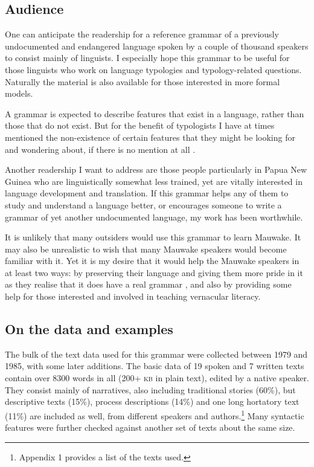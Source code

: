 \subsection{Audience} 
One can anticipate the readership for a reference grammar of a previously undocumented and endangered language spoken by a couple of thousand speakers to consist mainly of linguists.  I especially hope this grammar to be useful for those linguists who work on language typologies and typology-related questions. Naturally the material is also available for those interested in more formal models.

A grammar is expected to describe features that exist in a language, rather than those that do not exist. But for the benefit of typologists I have at times mentioned the non-existence of certain features that they might be looking for and wondering about, if there is no mention at all \citep{Cristofaro2006}. 

Another readership I want to address are those people particularly in Papua New Guinea who are linguistically somewhat less trained, yet are vitally interested in language development and translation.  If this grammar helps any of them to study and understand a language better, or encourages someone to write a grammar of yet another undocumented language, my work has been worthwhile.

It is unlikely that many outsiders would use this grammar to learn Mauwake.  It may also be unrealistic to wish that many Mauwake speakers would become familiar with it. Yet it is my desire that it would help the Mauwake speakers in at least two ways: by preserving their language and giving them more pride in it as they realise that it does have a real grammar \citep[255]{Kadanya2006}, and also by providing some help for those interested and involved in teaching vernacular literacy.

\subsection{On the data and examples} 
The bulk of the text data used for this grammar were collected between 1979 and 1985, with some later additions. The basic data of 19 spoken and 7 written texts contain over 8300 words in all (200+ \textsc{kb} in plain text), edited by a native speaker. They consist mainly of narratives, also including traditional stories (60\%), but descriptive texts (15\%), process descriptions (14\%) and one long hortatory text (11\%) are included as well, from different speakers and authors.\footnote{Appendix 1 provides a list of the texts used.} Many syntactic features were further checked against another set of texts about the same size. 

